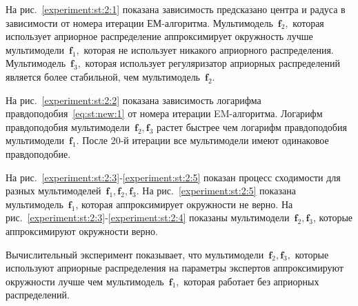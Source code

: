 На рис.~\ref{experiment:st:2:1} показана зависимость предсказано центра и радуса в зависимости от номера итерации ЕМ-алгоритма.
Мультимодель~$\textbf{f}_2,$ которая использует априорное распределение аппроксимирует окружность лучше мультимодели~$\textbf{f}_1,$ которая не использует никакого априорного распределения.
Мультимодель~$\textbf{f}_3,$ которая использует регуляризатор априорных распределений является более стабильной, чем мультимодель~$\textbf{f}_2$.

На рис.~\ref{experiment:st:2:2} показана зависимость логарифма правдоподобия~\eqref{eq:st:new:1} от номера итерации EM-алгоритма.
Логарифм правдоподобия мультимодели~$\textbf{f}_2, \textbf{f}_3$ растет быстрее чем логарифм правдоподобия мультимодели~$\textbf{f}_1$.  После $20$-й итерации все мультимодели имеют одинаковое правдоподобие.

На рис.~\ref{experiment:st:2:3}-\ref{experiment:st:2:5} показан процесс сходимости для разных мультимоделей~$\textbf{f}_1, \textbf{f}_2, \textbf{f}_3$.
На рис.~\ref{experiment:st:2:5} показана мультимодель~$\textbf{f}_1$, которая аппроксимирует окружности не верно.
На рис.~\ref{experiment:st:2:3}-\ref{experiment:st:2:4} показаны мультимодели~$\textbf{f}_2, \textbf{f}_3$, которые аппроксимируют окружности верно.

Вычислительный эксперимент показывает, что мультимодели~$\textbf{f}_2, \textbf{f}_3,$ которые используют априорные распределения на параметры экспертов аппроксимируют окружности лучше чем мультимодель~$\textbf{f}_1,$ которая работает без априорных распределений.


